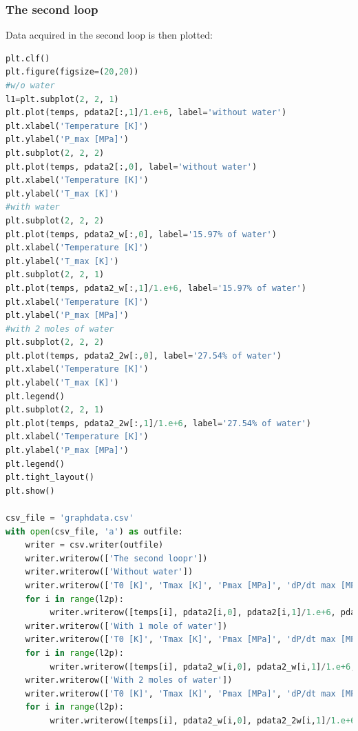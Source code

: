 \documentclass[a4paper]{article}
\begin{document}
\subsubsection{The second loop}
Data acquired in the second loop is then plotted:
\begin{lstlisting}[language=python]
plt.clf()
plt.figure(figsize=(20,20))
#w/o water
l1=plt.subplot(2, 2, 1)
plt.plot(temps, pdata2[:,1]/1.e+6, label='without water')
plt.xlabel('Temperature [K]')
plt.ylabel('P_max [MPa]')
plt.subplot(2, 2, 2)
plt.plot(temps, pdata2[:,0], label='without water')
plt.xlabel('Temperature [K]')
plt.ylabel('T_max [K]')
#with water
plt.subplot(2, 2, 2)
plt.plot(temps, pdata2_w[:,0], label='15.97% of water')
plt.xlabel('Temperature [K]')
plt.ylabel('T_max [K]')
plt.subplot(2, 2, 1)
plt.plot(temps, pdata2_w[:,1]/1.e+6, label='15.97% of water')
plt.xlabel('Temperature [K]')
plt.ylabel('P_max [MPa]')
#with 2 moles of water
plt.subplot(2, 2, 2)
plt.plot(temps, pdata2_2w[:,0], label='27.54% of water')
plt.xlabel('Temperature [K]')
plt.ylabel('T_max [K]')
plt.legend()
plt.subplot(2, 2, 1)
plt.plot(temps, pdata2_2w[:,1]/1.e+6, label='27.54% of water')
plt.xlabel('Temperature [K]')
plt.ylabel('P_max [MPa]')
plt.legend()
plt.tight_layout()
plt.show()

csv_file = 'graphdata.csv'
with open(csv_file, 'a') as outfile:
    writer = csv.writer(outfile)
    writer.writerow(['The second loopr'])
    writer.writerow(['Without water'])
    writer.writerow(['T0 [K]', 'Tmax [K]', 'Pmax [MPa]', 'dP/dt max [MPa/s]'])
    for i in range(l2p):
         writer.writerow([temps[i], pdata2[i,0], pdata2[i,1]/1.e+6, pdata2[i,2]])
    writer.writerow(['With 1 mole of water'])
    writer.writerow(['T0 [K]', 'Tmax [K]', 'Pmax [MPa]', 'dP/dt max [MPa/s]'])
    for i in range(l2p):
         writer.writerow([temps[i], pdata2_w[i,0], pdata2_w[i,1]/1.e+6, pdata2_w[i,2]])
    writer.writerow(['With 2 moles of water'])
    writer.writerow(['T0 [K]', 'Tmax [K]', 'Pmax [MPa]', 'dP/dt max [MPa/s]'])
    for i in range(l2p):
         writer.writerow([temps[i], pdata2_w[i,0], pdata2_2w[i,1]/1.e+6, pdata2_2w[i,2]])
\end{lstlisting}
\end{document}
